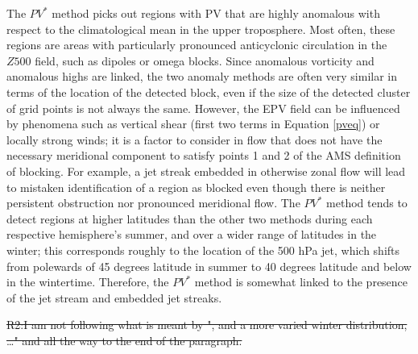 \documentclass[smallextended]{svjour3}       %
\numberwithin{equation}{section}
\begin{document}
The $PV^*$ method picks out regions with PV that are highly anomalous with respect to the climatological mean in the upper troposphere. Most often, these regions are areas with particularly pronounced anticyclonic circulation in the $Z500$ field, such as dipoles or omega blocks. Since anomalous vorticity and anomalous highs are linked, the two anomaly methods are often very similar in terms of the location of the detected block, even if the size of the detected cluster of grid points is not always the same. However, the EPV field can be influenced by phenomena such as vertical shear (first two terms in Equation \ref{pveq}) or locally strong winds; it is a factor to consider in flow that does not have the necessary meridional component to satisfy points 1 and 2 of the AMS definition of blocking. For example, a jet streak embedded in otherwise zonal flow will lead to mistaken identification of a region as blocked even though there is neither persistent obstruction nor pronounced meridional flow. {\color{blue}The $PV^*$ method tends to detect regions at higher latitudes than the other two methods during each respective hemisphere's summer, and over a wider range of latitudes in the winter; this corresponds roughly to the location of the 500 hPa jet, which shifts from polewards of 45 degrees latitude in summer to 40 degrees latitude and below in the wintertime. Therefore, the $PV^*$ method is somewhat linked to the presence of the jet stream and embedded jet streaks.}

{\color{teal}\sout{R2:I am not following what is meant by ", and a more varied winter distribution, …" and all the way to the end of the paragraph.}}
\end{document}
